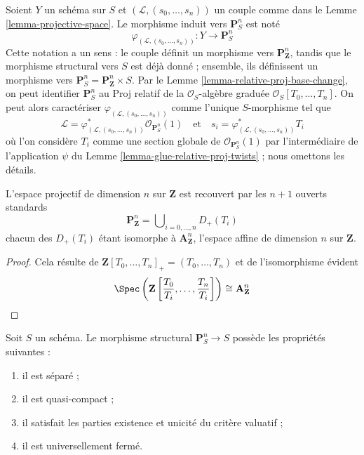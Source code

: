 \noindent
Soient $Y$ un schéma sur $S$ et
$(\mathcal{L}, (s_0, \ldots, s_n))$ un couple comme dans le
Lemme \ref{lemma-projective-space}. Le morphisme induit vers
$\mathbf{P}^n_S$ est noté
$$
\varphi_{(\mathcal{L}, (s_0, \ldots, s_n))} :
Y \longrightarrow \mathbf{P}^n_S
$$
Cette notation a un sens : le couple définit un morphisme vers
$\mathbf{P}^n_{\mathbf{Z}}$, tandis que le morphisme structural vers $S$ est
déjà donné ; ensemble, ils définissent un morphisme vers
$\mathbf{P}^n_S = \mathbf{P}^n_{\mathbf{Z}} \times S$.
Par le Lemme \ref{lemma-relative-proj-base-change}, on peut identifier
$\mathbf{P}^n_S$ au Proj relatif de la $\mathcal{O}_S$-algèbre graduée
$\mathcal{O}_S[T_0, \ldots, T_n]$. On peut alors caractériser
$\varphi_{(\mathcal{L}, (s_0, \ldots, s_n))}$ comme l'unique $S$-morphisme tel
que
$$
\mathcal{L} =
\varphi_{(\mathcal{L}, (s_0, \ldots, s_n))}^*\mathcal{O}_{\mathbf{P}^n_S}(1)
\quad
\text{et}
\quad
s_i = \varphi_{(\mathcal{L}, (s_0, \ldots, s_n))}^*T_i
$$
où l'on considère $T_i$ comme une section globale de
$\mathcal{O}_{\mathbf{P}^n_S}(1)$ par l'intermédiaire de l'application $\psi$
du Lemme \ref{lemma-glue-relative-proj-twists} ; nous omettons les détails.

\begin{lemma}
\label{lemma-standard-covering-projective-space}
L'espace projectif de dimension $n$ sur $\mathbf{Z}$ est recouvert par les
$n + 1$ ouverts standards
$$
\mathbf{P}^n_{\mathbf{Z}} =
\bigcup\nolimits_{i = 0, \ldots, n} D_{+}(T_i)
$$
chacun des $D_{+}(T_i)$ étant isomorphe à $\mathbf{A}^n_{\mathbf{Z}}$,
l'espace affine de dimension $n$ sur $\mathbf{Z}$.
\end{lemma}

\begin{proof}
Cela résulte de
$\mathbf{Z}[T_0, \ldots, T_n]_{+} = (T_0, \ldots, T_n)$
et de l'isomorphisme
évident
$$
\Spec
\left(
\mathbf{Z}
\left[\frac{T_0}{T_i}, \ldots, \frac{T_n}{T_i}
\right]
\right)
\cong
\mathbf{A}^n_{\mathbf{Z}}
$$
\end{proof}

\begin{lemma}
\label{lemma-projective-space-separated}
Soit $S$ un schéma. Le morphisme structural $\mathbf{P}^n_S \to S$
possède les propriétés suivantes :
\begin{enumerate}
\item il est séparé ;
\item il est quasi-compact ;
\item il satisfait les parties existence
et unicité du critère valuatif ;
\item il est universellement fermé.
\end{enumerate}
\end{lemma}

